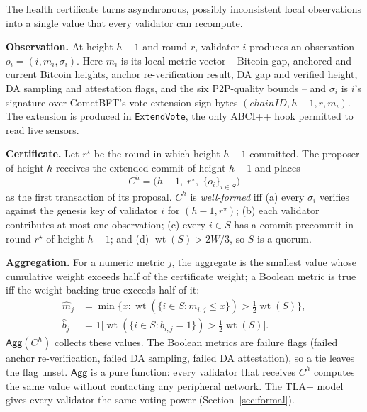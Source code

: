 The health certificate turns asynchronous, possibly inconsistent local
observations into a single value that every validator can recompute.

\textbf{Observation.} At height $h{-}1$ and round $r$, validator $i$ produces
an observation $o_i = (i, m_i, \sigma_i)$. Here $m_i$ is its local metric
vector -- Bitcoin gap, anchored and current Bitcoin heights, anchor
re-verification result, DA gap and verified height, DA sampling and
attestation flags, and the six P2P-quality bounds -- and $\sigma_i$ is $i$'s
signature over CometBFT's vote-extension sign bytes
$(\mathit{chainID}, h{-}1, r, m_i)$. The extension is produced in
\texttt{ExtendVote}, the only ABCI++ hook permitted to read live sensors.

\textbf{Certificate.} Let $r^{\star}$ be the round in which height $h{-}1$
committed. The proposer of height $h$ receives the extended commit of height
$h{-}1$ and places
\[
C^{h} = \bigl(h{-}1,\; r^{\star},\; \{o_i\}_{i \in S}\bigr)
\]
as the first transaction of its proposal. $C^{h}$ is \emph{well-formed} iff
(a) every $\sigma_i$ verifies against the genesis key of validator $i$ for
$(h{-}1, r^{\star})$; (b) each validator contributes at most one observation;
(c) every $i \in S$ has a commit precommit in round $r^{\star}$ of height
$h{-}1$; and (d) $\operatorname{wt}(S) > 2W/3$, so $S$ is a quorum.

\textbf{Aggregation.} For a numeric metric $j$, the aggregate is the smallest
value whose cumulative weight exceeds half of the certificate weight; a
Boolean metric is true iff the weight backing true exceeds half of it:
\begin{align}
\widehat m_j &= \min\bigl\{x : \operatorname{wt}(\{i \in S : m_{i,j} \le x\}) > \tfrac12 \operatorname{wt}(S)\bigr\}, \label{eq:agg}\\
\widehat b_j &= \mathbf{1}\bigl[\operatorname{wt}(\{i \in S : b_{i,j} = 1\}) > \tfrac12 \operatorname{wt}(S)\bigr]. \nonumber
\end{align}
$\mathsf{Agg}(C^{h})$ collects these values. The Boolean metrics are failure
flags (failed anchor re-verification, failed DA sampling, failed DA
attestation), so a tie leaves the flag unset. $\mathsf{Agg}$ is a pure
function: every validator that receives $C^{h}$ computes the same value
without contacting any peripheral network. The TLA+ model gives every
validator the same voting power (Section~\ref{sec:formal}).


